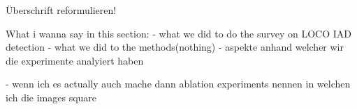 Überschrift reformulieren!

What i wanna say in this section:
- what we did to do the survey on LOCO IAD detection
- what we did to the methods(nothing)
- aspekte anhand welcher wir die experimente analyiert haben

- wenn ich es actually auch mache dann ablation experiments nennen in welchen ich die images square






